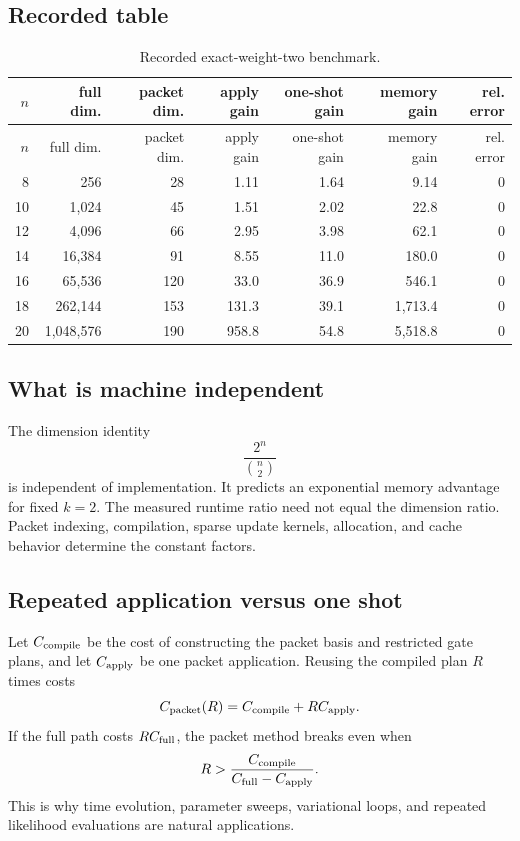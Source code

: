 \subsection{Recorded table}
\begin{longtable}{@{}rrrrrrr@{}}
\caption{Recorded exact-weight-two benchmark.}\label{s:tab:weight-two}\\
\toprule
$n$ & full dim. & packet dim. & apply gain & one-shot gain & memory gain & rel. error\\
\midrule
\endfirsthead
\toprule
$n$ & full dim. & packet dim. & apply gain & one-shot gain & memory gain & rel. error\\
\midrule
\endhead
8 & 256 & 28 & 1.11 & 1.64 & 9.14 & 0\\
10 & 1,024 & 45 & 1.51 & 2.02 & 22.8 & 0\\
12 & 4,096 & 66 & 2.95 & 3.98 & 62.1 & 0\\
14 & 16,384 & 91 & 8.55 & 11.0 & 180.0 & 0\\
16 & 65,536 & 120 & 33.0 & 36.9 & 546.1 & 0\\
18 & 262,144 & 153 & 131.3 & 39.1 & 1,713.4 & 0\\
20 & 1,048,576 & 190 & 958.8 & 54.8 & 5,518.8 & 0\\
\bottomrule
\end{longtable}

\subsection{What is machine independent}
The dimension identity
\[
\frac{2^n}{\binom n2}
\]
is independent of implementation. It predicts an exponential memory advantage for fixed $k=2$. The measured runtime ratio need not equal the dimension ratio. Packet indexing, compilation, sparse update kernels, allocation, and cache behavior determine the constant factors.

\subsection{Repeated application versus one shot}
Let $C_{\rm compile}$ be the cost of constructing the packet basis and restricted gate plans, and let $C_{\rm apply}$ be one packet application. Reusing the compiled plan $R$ times costs
\[
C_{\rm packet}(R)
=
C_{\rm compile}+RC_{\rm apply}.
\]
If the full path costs $RC_{\rm full}$, the packet method breaks even when
\[
R>
\frac{C_{\rm compile}}
{C_{\rm full}-C_{\rm apply}}.
\]
This is why time evolution, parameter sweeps, variational loops, and repeated likelihood evaluations are natural applications.

